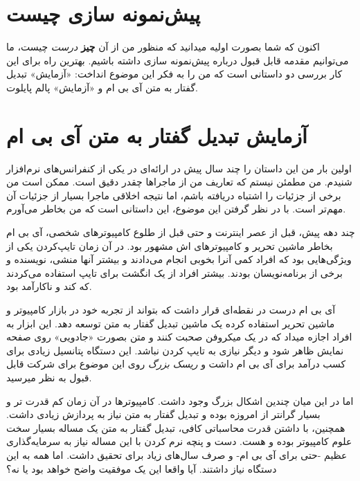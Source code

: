 \section{پیش‌نمونه سازی
چیست}\label{ux67eux6ccux634ux646ux645ux648ux646ux647-ux633ux627ux632ux6cc-ux686ux6ccux633ux62a}

اکنون که شما بصورت اولیه میدانید که منظور من از آن \textbf{چیز}
\emph{درست} چیست، ما می‌توانیم مقدمه قابل قبول درباره پیش‌نمونه سازی
داشته باشیم. بهترین راه برای این کار بررسی دو داستانی است که من را به
فکر این موضوع انداخت: «آزمایش» تبدیل گفتار به متن آی بی ام و «آزمایش»
پالم پایلوت.

\section{آزمایش تبدیل گفتار به متن آی بی
ام}\label{ux622ux632ux645ux627ux6ccux634-ux62aux628ux62fux6ccux644-ux6afux641ux62aux627ux631-ux628ux647-ux645ux62aux646-ux622ux6cc-ux628ux6cc-ux627ux645}

اولین بار من این داستان را چند سال پیش در ارائه‌ای در یکی از کنفرانس‌های
نرم‌افزار شنیدم. من مطمئن نیستم که تعاریف من از ماجراها چقدر دقیق است.
ممکن است من برخی از جزئیات را اشتباه دریافته باشم، اما نتیجه اخلاقی
ماجرا بسیار از جزئیات آن مهم‌تر است. با در نظر گرفتن این موضوع، این
داستانی است که من بخاطر می‌آورم.

چند دهه پیش، قبل از عصر اینترنت و حتی قبل از طلوع کامپیوترهای شخصی، آی
بی ام بخاطر ماشین تحریر و کامپیوترهای  اش مشهور بود. در آن
زمان تایپ‌کردن یکی از ویژگی‌هایی بود که افراد کمی آنرا بخوبی انجام
می‌دادند و بیشتر آنها منشی، نویسنده و برخی از برنامه‌نویسان بودند. بیشتر
افراد از یک انگشت برای تایپ استفاده می‌کردند که کند و ناکارآمد بود.

آی بی ام درست در نقطه‌ای قرار داشت که بتواند از تجربه خود در بازار
کامپیوتر و ماشین تحریر استفاده کرده یک ماشین تبدیل گفتار به متن توسعه
دهد. این ابزار به افراد اجازه میداد که در یک میکروفن صحبت کنند و متن
بصورت «جادویی» روی صفحه نمایش ظاهر شود و دیگر نیازی به تایپ کردن نباشد.
این دستگاه پتانسیل زیادی برای کسب درآمد برای آی بی ام داشت و \emph{ریسک
بزرگ} روی این موضوع برای شرکت قابل قبول به نظر میرسید.

اما در این میان چندین اشکال بزرگ وجود داشت. کامپیوترها در آن زمان کم
قدرت تر و بسیار گرانتر از امروزه بوده و تبدیل گفتار به متن نیاز به
پردازش زیادی داشت. همچنین، با داشتن قدرت محاسباتی کافی، تبدیل گفتار به
متن یک مساله بسیار سخت علوم کامپیوتر بوده و هست. دست و پنچه نرم کردن با
این مساله نیاز به سرمایه‌گذاری عظیم -حتی برای آی بی ام- و صرف سال‌های
زیاد برای تحقیق داشت. اما همه به این دستگاه نیاز داشتند. آیا واقعا این
یک موفقیت واضح خواهد بود یا نه؟

